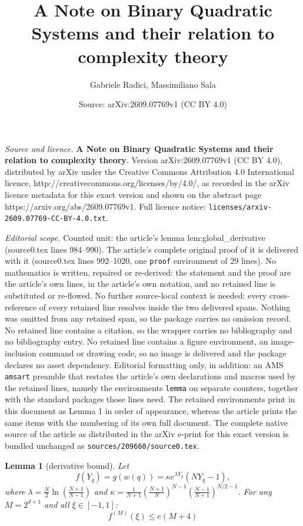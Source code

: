 \documentclass[10pt,a4paper]{amsart}
\title{\textbf{A Note on Binary Quadratic Systems and their relation to complexity theory}}
\author{Gabriele Radici, Massimiliano Sala}
\date{Source: arXiv:2609.07769v1 (CC BY 4.0)}
\newtheorem{lemma}{Lemma}
\begin{document}
\maketitle

\noindent\emph{Source and licence.} \textbf{A Note on Binary Quadratic Systems and their relation to complexity theory}. Version arXiv:2609.07769v1 (CC BY 4.0), distributed by arXiv under the Creative Commons Attribution 4.0 International licence, http://creativecommons.org/licenses/by/4.0/, as recorded in the arXiv licence metadata for this exact version and shown on the abstract page https://arxiv.org/abs/2609.07769v1. Full licence notice: \texttt{licenses/arxiv-2609.07769-CC-BY-4.0.txt}.\par\smallskip

\noindent\textit{Editorial scope.} Counted unit: the article's lemma lem:global\_derivative (source0.tex lines 984--990). The article's complete original proof of it is delivered with it (source0.tex lines 992--1020, one \texttt{proof} environment of 29 lines). No mathematics is written, repaired or re-derived: the statement and the proof are the article's own lines, in the article's own notation, and no retained line is substituted or re-flowed.  No further source-local context is needed: every cross-reference of every retained line resolves inside the two delivered spans.  Nothing was omitted from any retained span, so the package carries no omission record.  No retained line contains a citation, so the wrapper carries no bibliography and no bibliography entry.  No retained line contains a figure environment, an image-inclusion command or drawing code, so no image is delivered and the package declares no asset dependency.  Editorial formatting only, in addition: an AMS \texttt{amsart} preamble that restates the article's own declarations and macros used by the retained lines, namely the environments \texttt{lemma} on separate counters, together with the standard packages those lines need.  The retained environments print in this document as Lemma 1 in order of appearance, whereas the article prints the same items with the numbering of its own full document.  The complete native source of the article as distributed in the arXiv e-print for this exact version is bundled unchanged as \texttt{sources/209660/source0.tex}.
\begin{lemma}[derivative bound]
\label{lem:global_derivative}
Let \[f(Y_q) = g(w(q)) = \kappa e^{\lambda Y_q} (NY_q - 1),\] where $\lambda = \frac{N}{2} \ln\left(\frac{N+1}{N-1}\right)$ and $\kappa = \frac{1}{N+1} \left(\frac{N+1}{N}\right)^{N-1} \left(\frac{N-1}{N+1}\right)^{N/2-1}$. For any $M = 2^{d+1}$ and all $\xi \in [-1, 1]$:
\[
f^{(M)}(\xi) \le e (M+4)
\]
\end{lemma}
\end{document}
